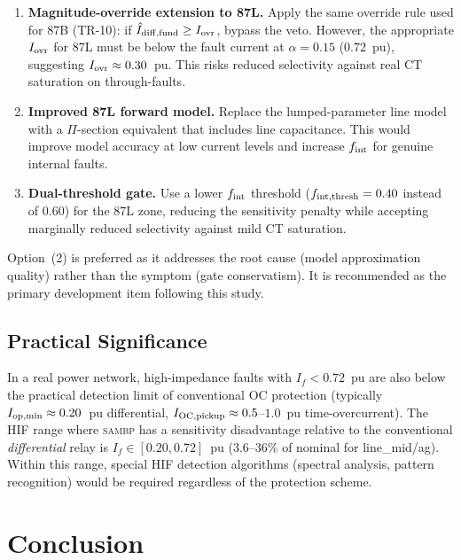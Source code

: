 \documentclass[12pt,a4paper]{article}
\newcommand{\SAMBP}{\textsc{sambp}}
\newcommand{\fint}{f_{\rm int}}
\newcommand{\Iopmin}{I_{\rm op,min}}
\begin{document}
\begin{enumerate}
  \item \textbf{Magnitude-override extension to 87L.}  Apply the same
    override rule used for 87B (TR-10): if $\hat{I}_{\rm diff,fund} \geq
    I_{\rm ovr}$, bypass the veto.  However, the appropriate $I_{\rm ovr}$
    for 87L must be below the fault current at $\alpha = 0.15$ (0.72~pu),
    suggesting $I_{\rm ovr} \approx 0.30$~pu.  This risks reduced
    selectivity against real CT saturation on through-faults.

  \item \textbf{Improved 87L forward model.}  Replace the lumped-parameter
    line model with a $\Pi$-section equivalent that includes line
    capacitance.  This would improve model accuracy at low current levels
    and increase $\fint$ for genuine internal faults.

  \item \textbf{Dual-threshold gate.}  Use a lower $\fint$ threshold
    ($f_{\rm int,thresh} = 0.40$ instead of 0.60) for the 87L zone,
    reducing the sensitivity penalty while accepting marginally reduced
    selectivity against mild CT saturation.
\end{enumerate}

Option~(2) is preferred as it addresses the root cause (model
approximation quality) rather than the symptom (gate conservatism).
It is recommended as the primary development item following this study.

\subsection{Practical Significance}

In a real power network, high-impedance faults with $I_f < 0.72$~pu
are also below the practical detection limit of conventional OC
protection (typically $\Iopmin \approx 0.20$~pu differential,
$I_{\rm OC,pickup} \approx 0.5$--$1.0$~pu time-overcurrent).  The
HIF range where \SAMBP{} has a sensitivity disadvantage relative to
the conventional \emph{differential} relay is $I_f \in [0.20, 0.72]$~pu
(3.6--36\% of nominal for line\_mid/ag).  Within this range, special
HIF detection algorithms (spectral analysis, pattern recognition) would
be required regardless of the protection scheme.

\section{Conclusion}
\end{document}

